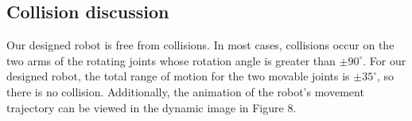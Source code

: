 \subsection{Collision discussion}

Our designed robot is free from collisions. In most cases, collisions occur on the two arms of the rotating joints whose rotation angle is greater than $±90^\circ$. For our designed robot, the total range of motion for the two movable joints is $±35^\circ$, so there is no collision. Additionally, the animation of the robot's movement trajectory can be viewed in the dynamic image in Figure 8.
